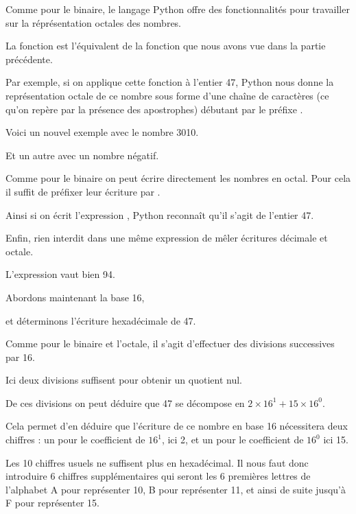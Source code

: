 


\diapo %

Comme pour le binaire, le langage Python offre des fonctionnalités pour travailler sur la réprésentation octales des nombres.

\change
La fonction  est l'équivalent de la fonction  que nous avons vue dans la partie précédente.

\change

Par exemple, si on applique cette fonction à l'entier 47, Python nous donne la représentation octale de ce nombre sous forme d'une chaîne de caractères (ce qu'on repère par la présence des apostrophes) débutant par le préfixe .

\change

Voici un nouvel exemple avec le nombre 3010.

\change
Et un autre avec un nombre négatif.


\change
Comme pour le binaire on peut écrire directement les nombres en octal. Pour cela il suffit de préfixer leur écriture par .

Ainsi si on écrit l'expression , Python reconnaît qu'il s'agit de l'entier 47.

\change

Enfin, rien interdit dans une même expression de mêler écritures décimale et octale. 

L'expression  vaut bien 94.
 
\diapo %

Abordons maintenant la base 16,

\change
et déterminons l'écriture hexadécimale de 47.

\change
Comme pour le binaire et l'octale, il s'agit d'effectuer des divisions successives par 16.

Ici deux divisions suffisent pour obtenir un quotient nul.

\change
De ces divisions on peut déduire que 47 se décompose en $2\times 16^1 + 15\times 16^0$.

Cela permet d'en déduire que l'écriture de ce nombre en base 16 nécessitera deux chiffres : un pour le coefficient de $16^1$, ici 2, et un pour le coefficient de $16^0$ ici 15. 

Les 10 chiffres usuels ne suffisent plus en hexadécimal. Il nous faut donc introduire 6 chiffres supplémentaires qui seront les 6 premières lettres de l'alphabet A pour représenter 10, B pour représenter 11, et ainsi de suite jusqu'à F pour représenter 15.

